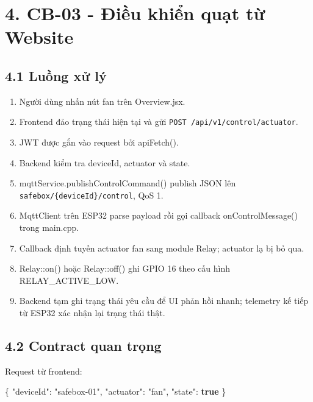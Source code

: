 \documentclass[11pt,oneside,openany]{book}
\renewcommand{\texttt}[1]{{\ttfamily\small #1}}
\newenvironment{Shaded}{\begin{snugshade}}{\end{snugshade}}
\newcommand{\DataTypeTok}[1]{\textcolor[rgb]{0.16,0.50,0.73}{#1}}
\newcommand{\FunctionTok}[1]{\textcolor[rgb]{0.56,0.27,0.68}{#1}}
\newcommand{\KeywordTok}[1]{\textcolor[rgb]{0.81,0.81,0.76}{\textbf{#1}}}
\newcommand{\StringTok}[1]{\textcolor[rgb]{0.96,0.31,0.31}{#1}}
\renewenvironment{Shaded}{%
  \def\FrameCommand{\fboxsep=8pt\colorbox{shadecolor}}%
  \MakeFramed{\advance\hsize-\width\FrameRestore}%
}{\endMakeFramed}
\providecommand{\tightlist}{\setlength{\itemsep}{1pt}\setlength{\parskip}{0pt}}
\begin{document}
\section{4. CB-03 - Điều khiển quạt từ
Website}\label{4-cb-03---ux111iux1ec1u-khiux1ec3n-quux1ea1t-tux1eeb-website}

\subsection{4.1 Luồng xử lý}\label{41-luux1ed3ng-xux1eed-luxfd}

\begin{enumerate}
\def\labelenumi{\arabic{enumi}.}
\tightlist
\item
  Người dùng nhấn nút fan trên \texttt{Overview.jsx}.
\item
  Frontend đảo trạng thái hiện tại và gửi
  \nolinkurl{POST /api/v1/control/actuator}.
\item
  JWT được gắn vào request bởi \texttt{apiFetch()}.
\item
  Backend kiểm tra \texttt{deviceId}, actuator và state.
\item
  \texttt{mqttService.publishControlCommand()} publish JSON lên
  \nolinkurl{safebox/{deviceId}/control}, QoS 1.
\item
  \texttt{MqttClient} trên ESP32 parse payload rồi gọi callback
  \texttt{onControlMessage()} trong \texttt{main.cpp}.
\item
  Callback định tuyến actuator \texttt{fan} sang module \texttt{Relay};
  actuator lạ bị bỏ qua.
\item
  \texttt{Relay::on()} hoặc \texttt{Relay::off()} ghi GPIO 16 theo cấu
  hình \texttt{RELAY\_ACTIVE\_LOW}.
\item
  Backend tạm ghi trạng thái yêu cầu để UI phản hồi nhanh; telemetry kế
  tiếp từ ESP32 xác nhận lại trạng thái thật.
\end{enumerate}

\subsection{4.2 Contract quan trọng}\label{42-contract-quan-trux1ecdng}

Request từ frontend:

\begin{Shaded}
\begin{Highlighting}[]
\FunctionTok{\{}
  \DataTypeTok{"deviceId"}\FunctionTok{:} \StringTok{"safebox{-}01"}\FunctionTok{,}
  \DataTypeTok{"actuator"}\FunctionTok{:} \StringTok{"fan"}\FunctionTok{,}
  \DataTypeTok{"state"}\FunctionTok{:} \KeywordTok{true}
\FunctionTok{\}}
\end{Highlighting}
\end{Shaded}
\end{document}
